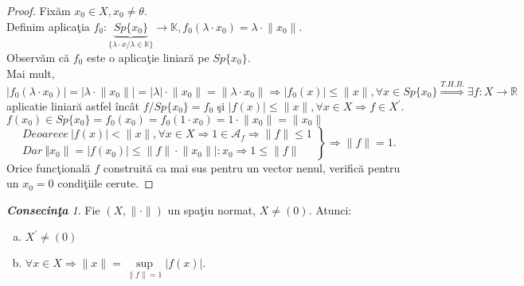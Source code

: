 \documentclass[ a4paper, 12pt]{report}
\theoremstyle{remark}
\newtheorem{cons}{\bf Consecin\c ta }[section]
\numberwithin{equation}{section}
\begin{document}
\begin{proof}
Fix\u am $x_0 \in X, x_0 \neq \theta.$\\
Definim aplica\c tia $f_0 : \underbrace{Sp\{x_0\}}_{\{ \lambda \cdot x / \lambda \in \mathbb{K} \}} \rightarrow \mathbb{K}, f_0(\lambda \cdot x_0) = \lambda \cdot \lVert x_0 \rVert. $\\
Observ\u am c\u a $f_0$ este o aplica\c tie liniar\u a pe $Sp\{ x_0 \}.$\\
Mai mult, $\lvert f_0(\lambda \cdot x_0) \rvert = \lvert \lambda \cdot \lVert x_0 \rVert \rvert = \lvert \lambda \rvert \cdot \lVert x_0  \rVert = \lVert \lambda \cdot x_0 \rVert \Rightarrow \lvert f_0(x) \rvert \leq \lVert x \rVert, \forall x \in Sp\{x_0\} \stackrel{T.H.B.}{\Longrightarrow} \exists f : X \rightarrow \mathbb{R}$ aplicatie liniar\u a astfel \^inc\^at $f/Sp\{x_0\} = f_0$ \c si $\lvert f(x) \rvert \leq \lVert x \rVert, \forall x \in X \Rightarrow f \in X^{'}.$\\
$f(x_0) \in Sp\{x_0\} = f_0(x_0) = f_0(1 \cdot x_0) = 1 \cdot \lVert x_0 \rVert = \lVert x_0 \rVert$\\
\begin{equation*}
  \left.\begin{aligned}
         Deoarece\  \lvert f(x) \rvert < \lVert x \rVert, \forall x \in X \Rightarrow 1 \in \mathcal{A}_{f} \Rightarrow \lVert f \rVert \leq 1\\
        Dar\   \Vert x_0 \rVert = \lvert f(x_0) \rvert \leq \lVert f \rVert \cdot \lVert x_0 \rVert|:x_0 \Rightarrow 1 \leq \lVert f \rVert
        \end{aligned}
  \right\}
  \mbox{$\Rightarrow \lVert f \rVert = 1.$}
 \end{equation*}
Orice func\c tional\u a $f$ construit\u a ca mai sus pentru un vector nenul, verific\u a pentru un $x_0 = 0$ condi\c tiile cerute.
\end{proof}
\begin{cons}
Fie $(X,\lVert \cdot \rVert)$ un spa\c tiu normat, $X \neq (0)$. Atunci:
\begin{enumerate}[(a)]
\item $X^{'} \neq (0)$
\item $\forall x \in X \Rightarrow \lVert x \rVert = \sup\limits_{\lVert f \rVert = 1}\lvert f(x) \rvert.$
\end{enumerate}
\end{cons}
\end{document}
